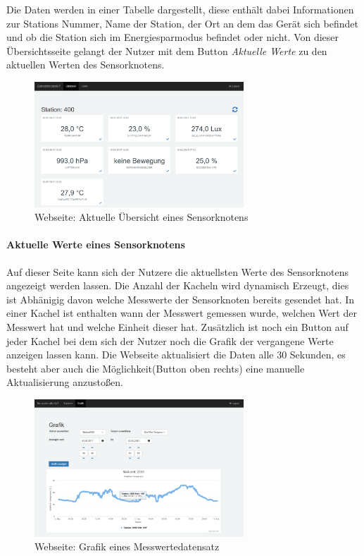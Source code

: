 Die Daten werden in einer Tabelle dargestellt, diese enthält dabei Informationen zur Stations Nummer, Name der Station, der Ort an dem das Gerät sich befindet und ob die Station sich im Energiesparmodus befindet oder nicht. Von dieser Übersichtsseite gelangt der Nutzer mit dem Button \textit{Aktuelle Werte} zu den aktuellen Werten des Sensorknotens.
\begin{figure}
	\centering
	\includegraphics[width=0.7\textwidth]{bilder/WebseiteSensorknotenAktuell}
	\caption{Webseite: Aktuelle Übersicht eines Sensorknotens}
	\label{img:WebseiteSensorknotenAktuell}
\end{figure}
\paragraph{Aktuelle Werte eines Sensorknotens} Auf dieser Seite kann sich der Nutzere die aktuellsten Werte des Sensorknotens angezeigt werden lassen. Die Anzahl der Kacheln wird dynamisch Erzeugt, dies ist Abhänigig davon welche Messwerte der Sensorknoten bereits gesendet hat. In einer Kachel ist enthalten wann der Messwert gemessen wurde, welchen Wert der Messwert hat und welche Einheit dieser hat. Zusätzlich ist noch ein Button auf jeder Kachel bei dem sich der Nutzer noch die Grafik der vergangene Werte anzeigen lassen kann. Die Webseite aktualisiert die Daten alle 30 Sekunden, es besteht aber auch die Möglichkeit(Button oben rechts) eine manuelle Aktualisierung anzustoßen.
\begin{figure}
	\centering
	\includegraphics[width=0.7\textwidth]{bilder/WebseiteGrafik}
	\caption{Webseite: Grafik eines Messwertedatensatz}
	\label{img:WebseiteGrafik}
\end{figure}

